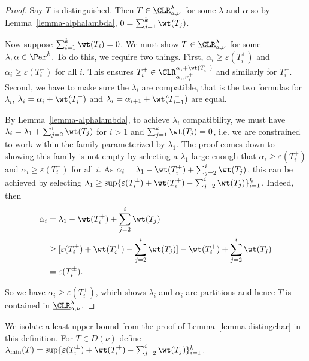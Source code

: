 \begin{proof}
    Say $T$ is distinguished. Then $T \in \underbar{\CLR}^\lambda_{\alpha, \nu}$ for some $\lambda$ and $\alpha$ so by Lemma~\ref{lemma-alphalambda}, $0 = \sum_{j=1}^{k} \wt(T_j)$.

    Now suppose $\sum_{i=1}^k \wt(T_i) = 0$. We must show $T \in \underbar{\CLR}^\lambda_{\alpha, \nu}$ for some $\lambda, \alpha \in \Par^k$. To do this, we require two things. First, $\alpha_i \geq \varepsilon(T_i^+)$ and $\alpha_i \geq \varepsilon(T_i^-)$ for all $i$. This ensures $T_i^+ \in \CLR_{\alpha_i, \nu_i^+}^{\alpha_i+\wt(T_i^+)}$ and similarly for $T_i^-$. Second, we have to make sure the $\lambda_i$ are compatible, that is the two formulas for $\lambda_i$, $\lambda_i = \alpha_i + \wt(T_i^+)$ and $\lambda_i = \alpha_{i+1}+ \wt(T_{i+1}^-)$ are equal.

    By Lemma~\ref{lemma-alphalambda}, to achieve $\lambda_i$ compatibility, we must have $\lambda_i = \lambda_1 + \sum_{j=2}^{i} \wt(T_j)$ for $i > 1$ and $\sum_{j=1}^k \wt(T_j) = 0$, i.e. we are constrained to work within the family parameterized by $\lambda_1$. The proof comes down to showing this family is not empty by selecting a $\lambda_1$ large enough that $\alpha_i \geq \varepsilon(T_i^+)$ and $\alpha_i \geq \varepsilon(T_i^-)$ for all $i$. As $\alpha_i = \lambda_1 - \wt(T_i^+) + \sum_{j=2}^{i} \wt(T_j)$, this can be achieved by selecting $\lambda_1 \geq \sup \{\varepsilon(T_i^\pm) + \wt(T_i^+) - \sum_{j=2}^{i} \wt(T_j)\}_{i=1}^k$. Indeed, then 
\begin{align*}
\alpha_i &= \lambda_1 - \wt(T_i^+) + \sum_{j=2}^{i} \wt(T_j)\\
&\geq [\varepsilon(T_i^\pm) + \wt(T_i^+) - \sum_{j=2}^{i} \wt(T_j)] - \wt(T_i^+) + \sum_{j=2}^{i} \wt(T_j)\\
&= \varepsilon(T_i^\pm).
\end{align*}
    
    So we have $\alpha_i \geq \varepsilon(T_i^\pm)$, which shows $\lambda_i$ and $\alpha_i$ are partitions and hence $T$ is contained in $\underbar{\CLR}^\lambda_{\alpha, \nu}$.

    \end{proof}

\begin{defn}
    We isolate a least upper bound from the proof of Lemma~\ref{lemma-distingchar} in this definition. For $T \in D(\nu)$ define $\lambda_{\min}(T) = \sup \{\varepsilon(T_i^\pm) + \wt(T_i^+) - \sum_{j=2}^{i} \wt(T_j)\}_{i=1}^k$.
\end{defn}

